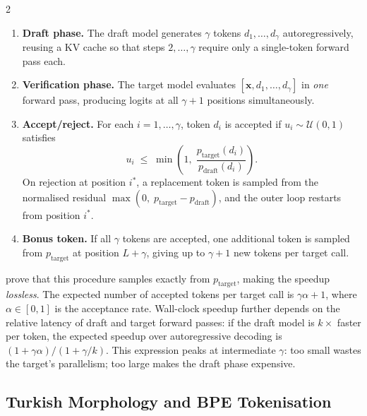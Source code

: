 \documentclass[11pt,a4paper]{article}
\begin{document}
\begin{multicols}{2}
\begin{enumerate}[leftmargin=*,itemsep=2pt]
  \item \textbf{Draft phase.} The draft model generates $\gamma$ tokens
        $d_1, \ldots, d_\gamma$ autoregressively, reusing a KV cache so
        that steps $2, \ldots, \gamma$ require only a single-token forward
        pass each.
  \item \textbf{Verification phase.} The target model evaluates
        $[\mathbf{x}, d_1, \ldots, d_\gamma]$ in \emph{one} forward pass,
        producing logits at all $\gamma\!+\!1$ positions simultaneously.
  \item \textbf{Accept/reject.} For each $i = 1, \ldots, \gamma$, token
        $d_i$ is accepted if $u_i \sim \mathcal{U}(0,1)$ satisfies
        \[
          u_i \;\leq\; \min\!\!\left(1,\;
            \frac{p_{\mathrm{target}}(d_i)}{p_{\mathrm{draft}}(d_i)}
          \right).
        \]
        On rejection at position $i^*$, a replacement token is sampled
        from the normalised residual
        $\max(0,\; p_{\mathrm{target}} - p_{\mathrm{draft}})$,
        and the outer loop restarts from position $i^*$.
  \item \textbf{Bonus token.} If all $\gamma$ tokens are accepted, one
        additional token is sampled from $p_{\mathrm{target}}$ at
        position $L + \gamma$, giving up to $\gamma\!+\!1$ new tokens
        per target call.
\end{enumerate}

\citet{leviathan2023fast} prove that this procedure samples exactly from
$p_{\mathrm{target}}$, making the speedup \emph{lossless}.
The expected number of accepted tokens per target call is
$\gamma\alpha + 1$, where $\alpha \in [0, 1]$ is the acceptance rate.
Wall-clock speedup further depends on the relative latency of draft and
target forward passes: if the draft model is $k\!\times$ faster per token,
the expected speedup over autoregressive decoding is
$(1+\gamma\alpha) / (1 + \gamma/k)$.
This expression peaks at intermediate $\gamma$: too small wastes the
target's parallelism; too large makes the draft phase expensive.

\subsection{Turkish Morphology and BPE Tokenisation}


\end{multicols}
\end{document}
